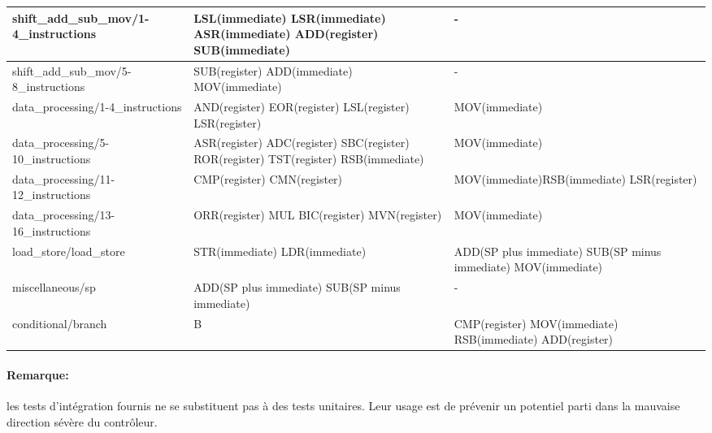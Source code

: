 \begin{tabularx}{\textwidth}{|l|X|X|}
shift{\_}add{\_}sub{\_}mov/1-4{\_}instructions		&  LSL(immediate) \newline LSR(immediate) \newline ASR(immediate) \newline ADD(register) \newline SUB(immediate) & -\\
\hline
shift{\_}add{\_}sub{\_}mov/5-8{\_}instructions			&  SUB(register) \newline ADD(immediate) \newline MOV(immediate) & -\\
\hline
data{\_}processing/1-4{\_}instructions			&  AND(register) \newline EOR(register) \newline LSL(register) \newline LSR(register) & MOV(immediate)\\
\hline
data{\_}processing/5-10{\_}instructions			&  ASR(register) \newline ADC(register) \newline SBC(register) \newline ROR(register) \newline TST(register) \newline RSB(immediate) & MOV(immediate)\\
\hline
data{\_}processing/11-12{\_}instructions			&  CMP(register) \newline CMN(register)  & MOV(immediate)\newline RSB(immediate) \newline LSR(register)\\
\hline
data{\_}processing/13-16{\_}instructions			&  ORR(register) \newline MUL \newline BIC(register) \newline MVN(register) & MOV(immediate)\\
\hline
load{\_}store/load{\_}store		&  STR(immediate) \newline LDR(immediate) & ADD(SP plus immediate) \newline SUB(SP minus immediate) \newline MOV(immediate)\\
\hline
miscellaneous/sp		&  ADD(SP plus immediate) \newline SUB(SP minus immediate) & -\\
\hline
conditional/branch		&  B & CMP(register) \newline MOV(immediate) \newline RSB(immediate) \newline ADD(register)\\
\hline
\end{tabularx}

\paragraph{Remarque:} les tests d'intégration fournis ne se substituent pas à des tests unitaires. Leur usage est de prévenir un potentiel parti dans la mauvaise direction sévère du contrôleur.